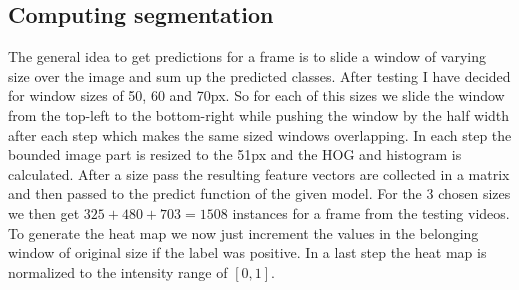 \subsection{Computing segmentation} %
\label{sub:computing_segmentation}
The general idea to get predictions for a frame is to slide a window of varying size over the image and sum up the predicted classes. After testing I have decided for window sizes of 50, 60 and 70px. So for each of this sizes we slide the window from the top-left to the bottom-right while pushing the window by the half width after each step which makes the same sized windows overlapping. In each step the bounded image part is resized to the 51px and the HOG and histogram is calculated. After a size pass the resulting feature vectors are collected in a matrix and then passed to the predict function of the given model. For the 3 chosen sizes we then get $325 + 480 + 703 = 1508$ instances for a frame from the testing videos. To generate the heat map we now just increment the values in the belonging window of original size if the label was positive. In a last step the heat map is normalized to the intensity range of $[0, 1]$.


